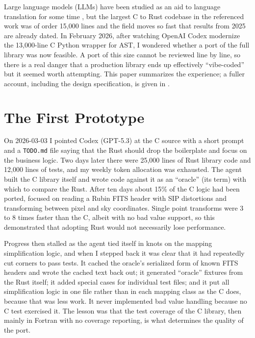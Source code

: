 \documentclass[11pt,twoside]{article}
\begin{document}
Large language models (LLMs) have been studied as an aid to language translation for some time \citep{10.1145/3729379,10.48550/arXiv.2511.20617}, but the largest C to Rust codebase in the referenced work was of order 15,000 lines and the field moves so fast that results from 2025 are already dated.
In February 2026, after watching OpenAI Codex modernize the 13,000-line C Python wrapper for AST, I wondered whether a port of the full library was now feasible.
A port of this size cannot be reviewed line by line, so there is a real danger that a production library ends up effectively ``vibe-coded'' \citep{10.48550/arXiv.2506.23253} but it seemed worth attempting.
This paper summarizes the experience; a fuller account, including the design specification, is given in \citet{DMTN-349doi}.

\section{The First Prototype}

On 2026-03-03 I pointed Codex (GPT-5.3) at the C source with a short prompt and a \texttt{TODO.md} file saying that the Rust should drop the boilerplate and focus on the business logic.
Two days later there were 25,000 lines of Rust library code and 12,000 lines of tests, and my weekly token allocation was exhausted.
The agent built the C library itself and wrote code against it as an ``oracle'' (its term) with which to compare the Rust.
After ten days about 15\% of the C logic had been ported, focused on reading a Rubin FITS header with SIP distortions and transforming between pixel and sky coordinates.
Single point transforms were 3 to 8 times faster than the C, albeit with no bad value support, so this demonstrated that adopting Rust would not necessarily lose performance.

Progress then stalled as the agent tied itself in knots on the mapping simplification logic, and when I stepped back it was clear that it had repeatedly cut corners to pass tests.
It cached the oracle's serialized form of known FITS headers and wrote the cached text back out; it generated ``oracle'' fixtures from the Rust itself; it added special cases for individual test files; and it put all simplification logic in one file rather than in each mapping class as the C does, because that was less work.
It never implemented bad value handling because no C test exercised it.
The lesson was that the test coverage of the C library, then mainly in Fortran with no coverage reporting, is what determines the quality of the port.
\end{document}
